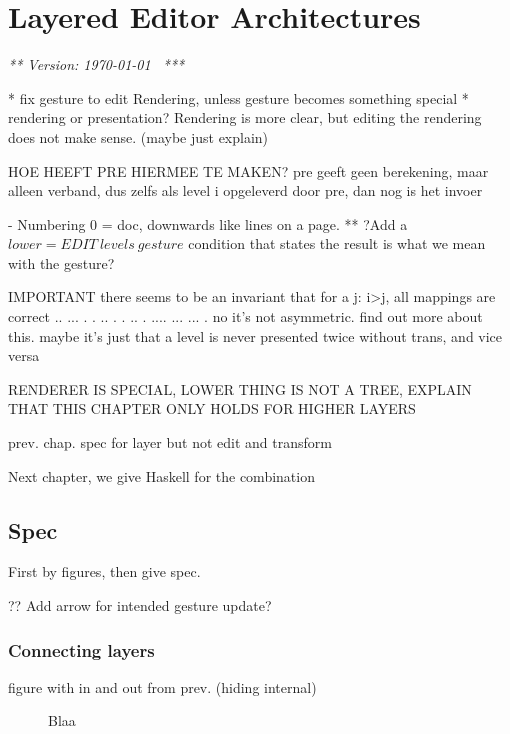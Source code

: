 \chapter{Layered Editor Architectures}
\label{chap:layeredArchs}
{\em *** Version: \today~ ***}



\bc
* fix gesture to edit Rendering, unless gesture becomes something special
* rendering or presentation? Rendering is more clear, but editing the rendering does not make sense. (maybe just explain)

HOE HEEFT PRE HIERMEE TE MAKEN? pre geeft geen berekening, maar alleen verband, dus zelfs als level i opgeleverd door pre, dan nog is het invoer

- Numbering 0 = doc, downwards like lines on a page.
** ?Add a $lower = EDIT~levels~gesture$ condition that states the result is what we mean with the gesture?



IMPORTANT there seems to be an invariant that for a j:  i>j, all mappings are correct 
  ..           ...       
 .  .    ..   .   .   .. 
.    ....  ...     ...  .
 no it's not asymmetric. find out more about this.
 maybe it's just that a level is never presented twice without trans, and vice versa

RENDERER IS SPECIAL, LOWER THING IS NOT A TREE, EXPLAIN THAT THIS CHAPTER ONLY HOLDS FOR HIGHER LAYERS


\ec




prev. chap. spec for layer but not edit and transform

Next chapter, we give Haskell for the combination

\section{Spec}

First by figures, then give spec.


?? Add arrow for intended gesture update?

\subsection{Connecting layers}

figure with in and out from prev. (hiding internal)

\begin{figure}\begin{small}\begin{center}\begin{center}
\end{center}
\caption{Blaa}\label{singleToMulti} 
\end{center}\end{small}\end{figure}

